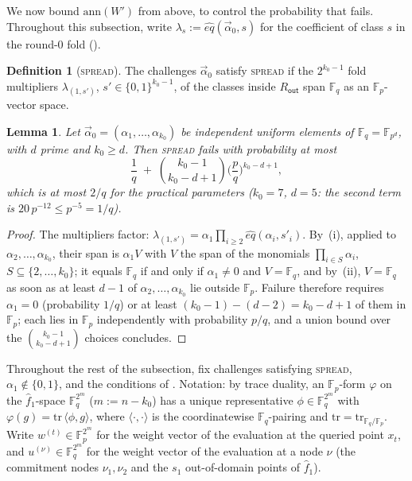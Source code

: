 \documentclass{article}
\newcommand{\Fp}{\mathbb{F}_p}
\newcommand{\Fq}{\mathbb{F}_q}
\newcommand{\extdeg}{d}
\newtheorem{lemma}[theorem]{Lemma}
\theoremstyle{definition}
\newtheorem{definition}[theorem]{Definition}
\begin{document}
We now bound $\mathrm{ann}(W')$ from above, to control the probability that  fails. Throughout this subsection, write $\lambda_s := \hat{eq}(\vec{\alpha}_0, s)$ for the coefficient of class $s$ in the round-0 fold ().

\begin{definition}[\textsc{spread}]\label{def:spread}
The challenges $\vec{\alpha}_0$ satisfy \textsc{spread} if the $2^{k_0 - 1}$ fold multipliers $\lambda_{(1, s')}$, $s' \in \{0,1\}^{k_0 - 1}$, of the classes inside $R_{\mathsf{out}}$ span $\Fq$ as an $\Fp$-vector space.
\end{definition}

\begin{lemma}\label{lem:spread}
Let $\vec{\alpha}_0 = (\alpha_1, \dots, \alpha_{k_0})$ be independent uniform elements of $\Fq = \mathbb{F}_{p^{\extdeg}}$, with $\extdeg$ prime and $k_0 \geq \extdeg$. Then \textsc{spread} fails with probability at most
\[
\frac{1}{q} \;+\; \binom{k_0 - 1}{k_0 - \extdeg + 1} \Big(\frac{p}{q}\Big)^{k_0 - \extdeg + 1} ,
\]
which is at most $2/q$ for the practical parameters ($k_0 = 7$, $\extdeg = 5$: the second term is $20\, p^{-12} \leq p^{-5} = 1/q$).
\end{lemma}

\begin{proof}
The multipliers factor: $\lambda_{(1, s')} = \alpha_1 \prod_{i \geq 2} \hat{eq}(\alpha_i, s'_i)$. By \,(i), applied to $\alpha_2, \dots, \alpha_{k_0}$, their span is $\alpha_1 V$ with $V$ the span of the monomials $\prod_{i \in S} \alpha_i$, $S \subseteq \{2, \dots, k_0\}$; it equals $\Fq$ if and only if $\alpha_1 \neq 0$ and $V = \Fq$, and by \,(ii), $V = \Fq$ as soon as at least $\extdeg - 1$ of $\alpha_2, \dots, \alpha_{k_0}$ lie outside $\Fp$. Failure therefore requires $\alpha_1 = 0$ (probability $1/q$) or at least $(k_0 - 1) - (\extdeg - 2) = k_0 - \extdeg + 1$ of them in $\Fp$; each lies in $\Fp$ independently with probability $p/q$, and a union bound over the $\binom{k_0 - 1}{k_0 - \extdeg + 1}$ choices concludes.
\end{proof}

Throughout the rest of the subsection, fix challenges satisfying \textsc{spread}, $\alpha_1 \notin \{0, 1\}$, and the conditions of . Notation: by trace duality, an $\Fp$-form $\varphi$ on the $\hat{f}_1$-space $\Fq^{2^m}$ ($m := n - k_0$) has a unique representative $\phi \in \Fq^{2^m}$ with $\varphi(g) = \mathrm{tr}\,\langle \phi, g \rangle$, where $\langle \cdot, \cdot \rangle$ is the coordinatewise $\Fq$-pairing and $\mathrm{tr} = \mathrm{tr}_{\Fq/\Fp}$. Write $w^{(t)} \in \Fp^{2^m}$ for the weight vector of the evaluation at the queried point $x_t$, and $u^{(\nu)} \in \Fq^{2^m}$ for the weight vector of the evaluation at a node $\nu$ (the commitment nodes $\nu_1, \nu_2$ and the $s_1$ out-of-domain points of $\hat{f}_1$).
\end{document}
